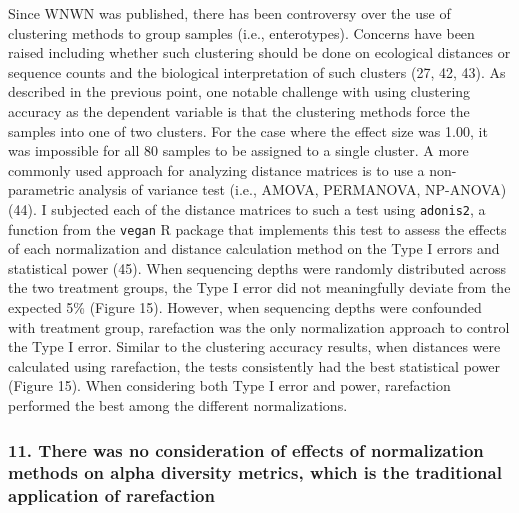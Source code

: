 \documentclass[
]{article}
\begin{document}
Since WNWN was published, there has been controversy over the use of
clustering methods to group samples (i.e., enterotypes). Concerns have
been raised including whether such clustering should be done on
ecological distances or sequence counts and the biological
interpretation of such clusters (27, 42, 43). As described in the
previous point, one notable challenge with using clustering accuracy as
the dependent variable is that the clustering methods force the samples
into one of two clusters. For the case where the effect size was 1.00,
it was impossible for all 80 samples to be assigned to a single cluster.
A more commonly used approach for analyzing distance matrices is to use
a non-parametric analysis of variance test (i.e., AMOVA, PERMANOVA,
NP-ANOVA)(44). I subjected each of the distance matrices to such a test
using \texttt{adonis2}, a function from the \texttt{vegan} R package
that implements this test to assess the effects of each normalization
and distance calculation method on the Type I errors and statistical
power (45). When sequencing depths were randomly distributed across the
two treatment groups, the Type I error did not meaningfully deviate from
the expected 5\% (Figure 15). However, when sequencing depths were
confounded with treatment group, rarefaction was the only normalization
approach to control the Type I error. Similar to the clustering accuracy
results, when distances were calculated using rarefaction, the tests
consistently had the best statistical power (Figure 15). When
considering both Type I error and power, rarefaction performed the best
among the different normalizations.

\hypertarget{there-was-no-consideration-of-effects-of-normalization-methods-on-alpha-diversity-metrics-which-is-the-traditional-application-of-rarefaction}{%
\subsubsection{11. There was no consideration of effects of
normalization methods on alpha diversity metrics, which is the
traditional application of
rarefaction}\label{there-was-no-consideration-of-effects-of-normalization-methods-on-alpha-diversity-metrics-which-is-the-traditional-application-of-rarefaction}}
\end{document}
